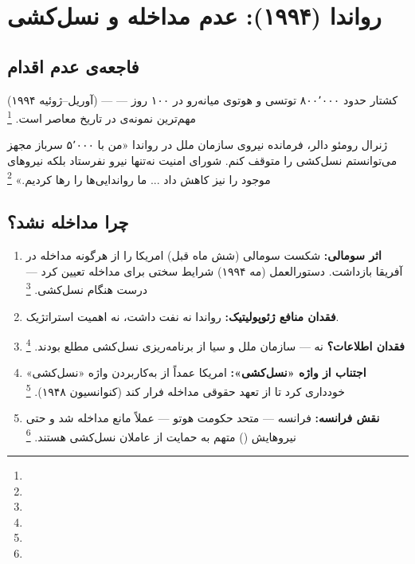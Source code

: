 \section{رواندا (۱۹۹۴): عدم مداخله و نسل‌کشی}
\label{sec:ch10-rwanda}

\subsection{فاجعه‌ی عدم اقدام}

 (آوریل–ژوئیه ۱۹۹۴) — کشتار حدود ۸۰۰٬۰۰۰ توتسی و هوتوی میانه‌رو در ۱۰۰ روز — مهم‌ترین نمونه‌ی  در تاریخ معاصر است.%
\footnote{}

\begin{histQuote}{ژنرال رومئو دالر، فرمانده نیروی سازمان ملل در رواندا}
«من با ۵٬۰۰۰ سرباز مجهز می‌توانستم نسل‌کشی را متوقف کنم. شورای امنیت نه‌تنها نیرو نفرستاد بلکه نیروهای موجود را نیز کاهش داد ... ما رواندایی‌ها را رها کردیم.»%
\footnote{}
\end{histQuote}

\subsection{چرا مداخله نشد؟}

\begin{tcolorbox}[failbox, title={عوامل عدم مداخله در رواندا}]
\begin{enumerate}[nosep, label=\textbf{\arabic*.}]
  \item \textbf{اثر سومالی:} شکست سومالی (شش ماه قبل) امریکا را از هرگونه مداخله در آفریقا بازداشت. دستورالعمل  (مه ۱۹۹۴) شرایط سختی برای مداخله تعیین کرد — درست هنگام نسل‌کشی.%
  \footnote{}
  \item \textbf{فقدان منافع ژئوپولیتیک:} رواندا نه نفت داشت، نه اهمیت استراتژیک.
  \item \textbf{فقدان اطلاعات؟} نه — سازمان ملل و سیا از برنامه‌ریزی نسل‌کشی مطلع بودند.%
  \footnote{}
  \item \textbf{اجتناب از واژه «نسل‌کشی»:} امریکا عمداً از به‌کاربردن واژه «نسل‌کشی» خودداری کرد تا از تعهد حقوقی مداخله فرار کند (کنوانسیون ۱۹۴۸).%
  \footnote{}
  \item \textbf{نقش فرانسه:} فرانسه — متحد حکومت هوتو — عملاً مانع مداخله شد و حتی نیروهایش () متهم به حمایت از عاملان نسل‌کشی هستند.%
  \footnote{}
\end{enumerate}
\end{tcolorbox}

